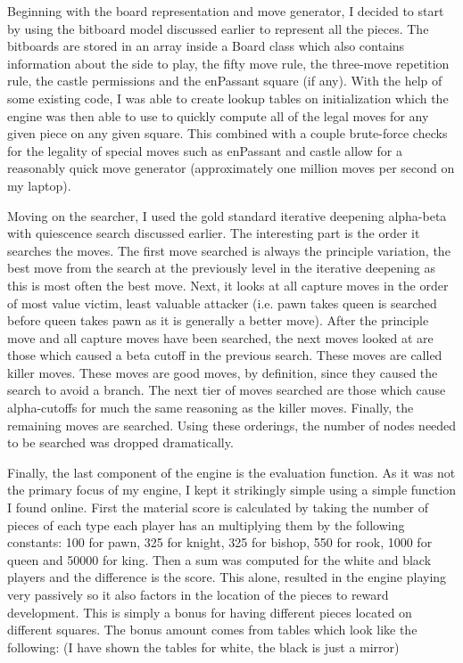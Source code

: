 \documentclass[11pt]{article}
\begin{document}
Beginning with the board representation and move generator, I decided to start by using the bitboard model discussed earlier to represent all the pieces. The bitboards are stored in an array inside a Board class which also contains information about the side to play, the fifty move rule, the three-move repetition rule, the castle permissions and the enPassant square (if any). With the help of some existing code\cite{bitboards}, I was able to create lookup tables on initialization which the engine was then able to use to quickly compute all of the legal moves for any given piece on any given square. This combined with a couple brute-force checks for the legality of special moves such as enPassant and castle allow for a reasonably quick move generator (approximately one million moves per second on my laptop). 

Moving on the searcher, I used the gold standard iterative deepening alpha-beta with quiescence search discussed earlier. The interesting part is the order it searches the moves. The first move searched is always the principle variation, the best move from the search at the previously level in the iterative deepening as this is most often the best move. Next, it looks at all capture moves in the order of most value victim, least valuable attacker (i.e. pawn takes queen is searched before queen takes pawn as it is generally a better move). After the principle move and all capture moves have been searched, the next moves looked at are those which caused a beta cutoff in the previous search. These moves are called killer moves. These moves are good moves, by definition, since they caused the search to avoid a branch. The next tier of moves searched are those which cause alpha-cutoffs for much the same reasoning as the killer moves. Finally, the remaining moves are searched. Using these orderings, the number of nodes needed to be searched was dropped dramatically. 

Finally, the last component of the engine is the evaluation function. As it was not the primary focus of my engine, I kept it strikingly simple using a simple function I found online\cite{BluefeverSoftware}. First the material score is calculated by taking the number of pieces of each type each player has an multiplying them by the following constants: 100 for pawn, 325 for knight, 325 for bishop, 550 for rook, 1000 for queen and 50000 for king. Then a sum was computed for the white and black players and the difference is the score. This alone, resulted in the engine playing very passively so it also factors in the location of the pieces to reward development. This is simply a bonus for having different pieces located on different squares. The bonus amount comes from tables which look like the following: (I have shown the tables for white, the black is just a mirror)
\end{document}
